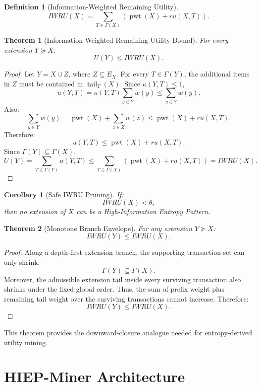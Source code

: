 \documentclass[11pt,a4paper]{article}
\newtheorem{definition}{Definition}
\newtheorem{theorem}{Theorem}
\newtheorem{corollary}{Corollary}
\newcommand{\pwt}{\operatorname{pwt}}
\newcommand{\tail}{\operatorname{tail}}
\begin{document}
\begin{definition}[Information-Weighted Remaining Utility]
\[
IWRU(X)=
\sum_{T\in\Gamma(X)}
\left(
\pwt(X)+ru(X,T)
\right).
\]
\end{definition}

\begin{theorem}[Information-Weighted Remaining Utility Bound]
For every extension \(Y\succeq X\):
\[
U(Y)\le IWRU(X).
\]
\end{theorem}

\begin{proof}
Let \(Y=X\cup Z\), where \(Z\subseteq E_X\). For every \(T\in\Gamma(Y)\), the additional items in \(Z\) must be contained in \(\tail_T(X)\). Since \(\kappa(Y,T)\le1\),
\[
u(Y,T)
=
\kappa(Y,T)
\sum_{y\in Y}w(y)
\le
\sum_{y\in Y}w(y).
\]
Also:
\[
\sum_{y\in Y}w(y)
=
\pwt(X)+\sum_{z\in Z}w(z)
\le
\pwt(X)+ru(X,T).
\]
Therefore:
\[
u(Y,T)\le \pwt(X)+ru(X,T).
\]
Since \(\Gamma(Y)\subseteq\Gamma(X)\),
\[
U(Y)
=
\sum_{T\in\Gamma(Y)}u(Y,T)
\le
\sum_{T\in\Gamma(X)}
\left(
\pwt(X)+ru(X,T)
\right)
=
IWRU(X).
\]
\end{proof}

\begin{corollary}[Safe IWRU Pruning]
If:
\[
IWRU(X)<\theta,
\]
then no extension of \(X\) can be a High-Information Entropy Pattern.
\end{corollary}

\begin{theorem}[Monotone Branch Envelope]
For any extension \(Y\succeq X\):
\[
IWRU(Y)\le IWRU(X).
\]
\end{theorem}

\begin{proof}
Along a depth-first extension branch, the supporting transaction set can only shrink:
\[
\Gamma(Y)\subseteq\Gamma(X).
\]
Moreover, the admissible extension tail inside every surviving transaction also shrinks under the fixed global order. Thus, the sum of prefix weight plus remaining tail weight over the surviving transactions cannot increase. Therefore:
\[
IWRU(Y)\le IWRU(X).
\]
\end{proof}

This theorem provides the downward-closure analogue needed for entropy-derived utility mining.

\section{HIEP-Miner Architecture}
\end{document}
